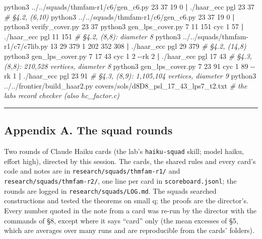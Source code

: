 \documentclass[
  10pt,
]{article}
\newenvironment{Shaded}{}{}
\newcommand{\AttributeTok}[1]{\textcolor[rgb]{0.49,0.56,0.16}{#1}}
\newcommand{\CommentTok}[1]{\textcolor[rgb]{0.38,0.63,0.69}{\textit{#1}}}
\newcommand{\ExtensionTok}[1]{#1}
\newcommand{\KeywordTok}[1]{\textcolor[rgb]{0.00,0.44,0.13}{\textbf{#1}}}
\newcommand{\NormalTok}[1]{#1}
\begin{document}
\begin{Shaded}
\begin{Highlighting}[]
\ExtensionTok{python3}\NormalTok{ ../../squads/thmfam{-}r1/c6/gen\_c6.py 23 37 19 0 }\KeywordTok{|} \ExtensionTok{./haar\_ecc}\NormalTok{ pgl 23 37  }\CommentTok{\# §4.2, (6,10)}
\ExtensionTok{python3}\NormalTok{ ../../squads/thmfam{-}r1/c6/gen\_c6.py 23 37 19 0 }\KeywordTok{|} \ExtensionTok{python3}\NormalTok{ verify\_cover.py 23 37}
\ExtensionTok{python3}\NormalTok{ gen\_lps\_cover.py 7 11 151 cyc 1 57 }\KeywordTok{|} \ExtensionTok{./haar\_ecc}\NormalTok{ pgl 11 151           }\CommentTok{\# §4.2, (8,8): diameter 8}
\ExtensionTok{python3}\NormalTok{ ../../squads/thmfam{-}r1/c7/c7lib.py 13 29 379 1 202 352 308 }\KeywordTok{|} \ExtensionTok{./haar\_ecc}\NormalTok{ pgl 29 379   }\CommentTok{\# §4.2, (14,8)}
\ExtensionTok{python3}\NormalTok{ gen\_lps\_cover.py 7 17 43 cyc 1 2 }\AttributeTok{{-}{-}rk}\NormalTok{ 2 }\KeywordTok{|} \ExtensionTok{./haar\_ecc}\NormalTok{ pgl 17 43        }\CommentTok{\# §4.3, (8,8): 210,528 vertices, diameter 8}
\ExtensionTok{python3}\NormalTok{ gen\_lps\_cover.py 7 23 91 cyc 1 89 }\AttributeTok{{-}{-}rk}\NormalTok{ 1 }\KeywordTok{|} \ExtensionTok{./haar\_ecc}\NormalTok{ pgl 23 91       }\CommentTok{\# §4.3, (8,9): 1,105,104 vertices, diameter 9}
\ExtensionTok{python3}\NormalTok{ ../../frontier/build\_haar2.py covers/sols/d8D8\_psl\_17\_43\_lps7\_t2.txt   }\CommentTok{\# the lab\textquotesingle{}s record checker (also hc\_factor.c)}
\end{Highlighting}
\end{Shaded}

\begin{center}\rule{0.5\linewidth}{0.5pt}\end{center}

\hypertarget{appendix-a.-the-squad-rounds}{%
\subsection{Appendix A. The squad
rounds}\label{appendix-a.-the-squad-rounds}}

Two rounds of Claude Haiku cards (the lab's \texttt{haiku-squad} skill;
model haiku, effort high), directed by this session. The cards, the
shared rules and every card's code and notes are in
\texttt{research/squads/thmfam-r1/} and
\texttt{research/squads/thmfam-r2/}, one line per card in
\texttt{scoreboard.jsonl}; the rounds are logged in
\texttt{research/squads/LOG.md}. The squads searched constructions and
tested the theorems on small q; the proofs are the director's. Every
number quoted in the note from a card was re-run by the director with
the commands of §8, except where it says ``card'' only (the mean
excesses of §5, which are averages over many runs and are reproducible
from the cards' folders).
\end{document}
